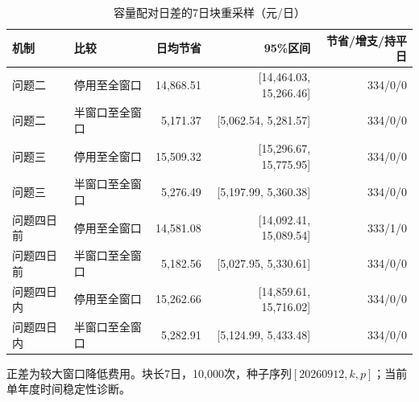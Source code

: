 \begin{table}[H]\centering\small
\caption{容量配对日差的7日块重采样（元/日）}\label{tab:capacityci}
\begin{tabular}{llrrr}\toprule
机制&比较&日均节省&95\%区间&节省/增支/持平日\\\midrule
问题二&停用至全窗口&14,868.51&[14,464.03, 15,266.46]&334/0/0\\
问题二&半窗口至全窗口&5,171.37&[5,062.54, 5,281.57]&334/0/0\\
问题三&停用至全窗口&15,509.32&[15,296.67, 15,775.95]&334/0/0\\
问题三&半窗口至全窗口&5,276.49&[5,197.99, 5,360.38]&334/0/0\\
问题四日前&停用至全窗口&14,581.08&[14,092.41, 15,089.54]&333/1/0\\
问题四日前&半窗口至全窗口&5,182.56&[5,027.95, 5,330.61]&334/0/0\\
问题四日内&停用至全窗口&15,262.66&[14,859.61, 15,716.02]&334/0/0\\
问题四日内&半窗口至全窗口&5,282.91&[5,124.99, 5,433.48]&334/0/0\\
\bottomrule\end{tabular}
\par\footnotesize 正差为较大窗口降低费用。块长7日，10,000次，种子序列$[20260912,k,p]$；当前单年度时间稳定性诊断。
\end{table}
